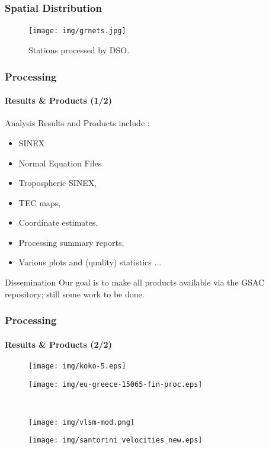 \documentclass{beamer}
\newcommand\FourQuad[4]{
    \begin{minipage}[b][.45\textheight][t]{.50\textwidth}\centering#1\end{minipage}\hfill%
    \begin{minipage}[b][.45\textheight][t]{.50\textwidth}\centering#2\end{minipage}\\[0.9em]
    \begin{minipage}[b][.45\textheight][t]{.50\textwidth}\centering#3\end{minipage}\hfill
    \begin{minipage}[b][.45\textheight][t]{.50\textwidth}\centering#4\end{minipage}%
}
\begin{document}
\begin{frame}\frametitle{Spatial Distribution}\framesubtitle{}

    \begin{figure}
        \begin{center}
        \texttt{[image: img/grnets.jpg]}
        \caption{Stations processed by DSO.}
        \label{fig:mits}
        \end{center}
    \end{figure}

\end{frame}

\begin{frame}\frametitle{Processing}\framesubtitle{Results \& Products (1/2)}

    Analysis Results and Products include :

    \begin{itemize}
    \item SINEX\footnotemark
    \item Normal Equation Files
    \item Tropospheric SINEX,
    \item TEC maps,
    \item Coordinate estimates,
    \item Processing summary reports,
    \item Various plots and (quality) statistics ...
    \end{itemize}

    \begin{block}{Dissemination}
        Our goal is to make all products available via the GSAC repository;
        still some work to be done.
    \end{block}

\end{frame}

\begin{frame}\frametitle{Processing}\framesubtitle{Results \& Products (2/2)}

    \FourQuad
    {
        \begin{figure}[t]
            \texttt{[image: img/koko-5.eps]}
        \end{figure}
    }
    {
        \begin{figure}[t]
            \texttt{[image: img/eu-greece-15065-fin-proc.eps]}
        \end{figure}
    }
    {
        \begin{figure}[b]
            \texttt{[image: img/vlsm-mod.png]}
        \end{figure}
    }
    {
        \begin{figure}[b]
            \texttt{[image: img/santorini\_velocities\_new.eps]}
        \end{figure}
    }

\end{frame}
\end{document}
